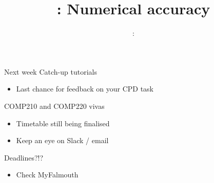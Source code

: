 \usepackage{../../beamerthemeFalmouthGamesAcademy}
\usepackage{multimedia}
\graphicspath{ {../../} }


\usepackage[normalem]{ulem}
\usepackage{wasysym}

\usepackage{pdfpages}

\usetikzlibrary{arrows,automata}




\title{\sessionnumber: Numerical accuracy}
\subtitle{\modulecode: \moduletitle}

\frame{\titlepage} 


\begin{frame}{Next week}
	Catch-up tutorials
	\begin{itemize}
		\item Last chance for feedback on your CPD task
	\end{itemize}
	COMP210 and COMP220 vivas
	\begin{itemize}
		\item Timetable still being finalised
		\item Keep an eye on Slack / email
	\end{itemize}
	Deadlines?!?
	\begin{itemize}
		\item Check MyFalmouth
	\end{itemize}
\end{frame}






